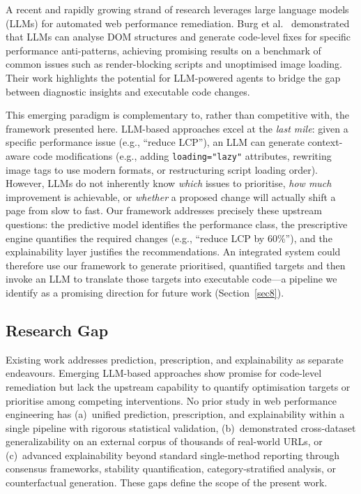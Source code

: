 \documentclass[sn-nature]{sn-jnl}
\begin{document}
A recent and rapidly growing strand of research leverages large language models (LLMs) for automated web performance remediation. Burg et al.~\cite{burg2026} demonstrated that LLMs can analyse DOM structures and generate code-level fixes for specific performance anti-patterns, achieving promising results on a benchmark of common issues such as render-blocking scripts and unoptimised image loading. Their work highlights the potential for LLM-powered agents to bridge the gap between diagnostic insights and executable code changes.

This emerging paradigm is complementary to, rather than competitive with, the framework presented here. LLM-based approaches excel at the \textit{last mile}: given a specific performance issue (e.g., ``reduce LCP''), an LLM can generate context-aware code modifications (e.g., adding \texttt{loading="lazy"} attributes, rewriting image tags to use modern formats, or restructuring script loading order). However, LLMs do not inherently know \textit{which} issues to prioritise, \textit{how much} improvement is achievable, or \textit{whether} a proposed change will actually shift a page from slow to fast. Our framework addresses precisely these upstream questions: the predictive model identifies the performance class, the prescriptive engine quantifies the required changes (e.g., ``reduce LCP by 60\%''), and the explainability layer justifies the recommendations. An integrated system could therefore use our framework to generate prioritised, quantified targets and then invoke an LLM to translate those targets into executable code---a pipeline we identify as a promising direction for future work (Section~\ref{sec8}).

\subsection{Research Gap}

Existing work addresses prediction, prescription, and explainability as separate endeavours. Emerging LLM-based approaches show promise for code-level remediation but lack the upstream capability to quantify optimisation targets or prioritise among competing interventions. No prior study in web performance engineering has (a)~unified prediction, prescription, and explainability within a single pipeline with rigorous statistical validation, (b)~demonstrated cross-dataset generalizability on an external corpus of thousands of real-world URLs, or (c)~advanced explainability beyond standard single-method reporting through consensus frameworks, stability quantification, category-stratified analysis, or counterfactual generation. These gaps define the scope of the present work.
\end{document}
